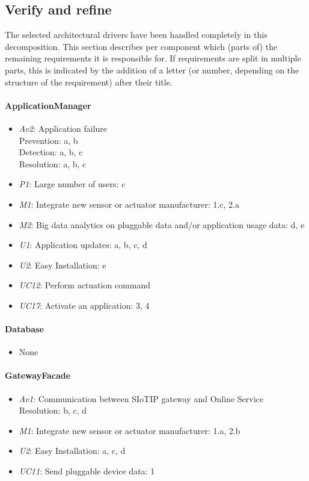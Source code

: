 \subsection{Verify and refine}
    The selected architectural drivers have been handled completely
    in this decomposition.
    This section describes per component which (parts of) the remaining
    requirements it is responsible for. If requirements are split in
    multiple parts, this is indicated by the addition of a letter
    (or number, depending on the structure of the requirement) after their title.

    \paragraph{ApplicationManager}
        \begin{itemize}
            \item \emph{Av2}: Application failure \\
                   Prevention: a, b \\
                   Detection: a, b, c \\
                   Resolution: a, b, c
           \item \emph{P1}: Large number of users: c
           \item \emph{M1}: Integrate new sensor or actuator manufacturer: 1.c, 2.a
           \item \emph{M2}: Big data analytics on pluggable data and/or application usage data: d, e
           \item \emph{U1}: Application updates: a, b, c, d
           \item \emph{U2}: Easy Installation: e
           \item \emph{UC12}: Perform actuation command
           \item \emph{UC17}: Activate an application: 3, 4
        \end{itemize}

    \paragraph{Database}
        \begin{itemize}
          	\item None
        \end{itemize}

    \paragraph{GatewayFacade}
        \begin{itemize}
            \item \emph{Av1}: Communication between SIoTIP gateway and Online Service \\
                              Resolution: b, c, d
            \item \emph{M1}: Integrate new sensor or actuator manufacturer: 1.a, 2.b
            \item \emph{U2}: Easy Installation: a, c, d
            \item \emph{UC11}: Send pluggable device data: 1
        \end{itemize}

